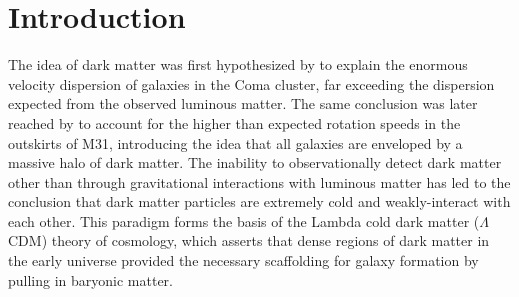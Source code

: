 \documentclass[twocolumn, linenumbers,trackchanges]{aastex7}
\begin{document}
\author[]{Nicolas Mazziotti}





\section{Introduction} 
The idea of dark matter was first hypothesized by \cite{Zwicky_1933} to explain the enormous velocity dispersion of galaxies in the Coma cluster, far exceeding the dispersion expected from the observed luminous matter. The same conclusion was later reached by \cite{Rubin_1970} to account for the higher than expected rotation speeds in the outskirts of M31, introducing the idea that all galaxies are enveloped by a massive halo of dark matter. The inability to observationally detect dark matter other than through gravitational interactions with luminous matter has led to the conclusion that dark matter particles are extremely cold and weakly-interact with each other. This paradigm forms the basis of the Lambda cold dark matter ($\Lambda$CDM) theory of cosmology, which asserts that dense regions of dark matter in the early universe provided the necessary scaffolding for galaxy formation by pulling in baryonic matter. 
\end{document}
